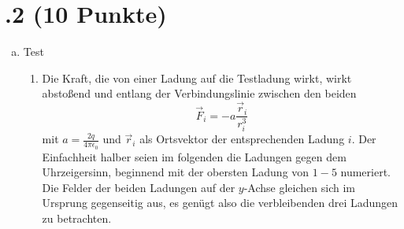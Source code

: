 \section*{\nr.2 \tittwo (10 Punkte)}
\begin{enumerate}[(a)]
\item Test
\begin{enumerate}[(1)]
\item Die Kraft, die von einer Ladung auf die Testladung wirkt, wirkt abstoßend und entlang der Verbindungslinie zwischen den beiden
\begin{equation}
  \vec F_i=-a \frac{\vec r_i}{r_i^3}
\end{equation}
mit $a=\frac{2q}{4\pi\epsilon_0}$ und $\vec r_i$ als Ortsvektor der entsprechenden Ladung $i$. Der Einfachheit halber seien im folgenden die Ladungen gegen dem Uhrzeigersinn, beginnend mit der obersten Ladung von $1-5$ numeriert.
Die Felder der beiden Ladungen auf der $y$-Achse gleichen sich im Ursprung gegenseitig aus, es genügt also die verbleibenden drei Ladungen zu betrachten. 

\end{enumerate}
\end{enumerate}